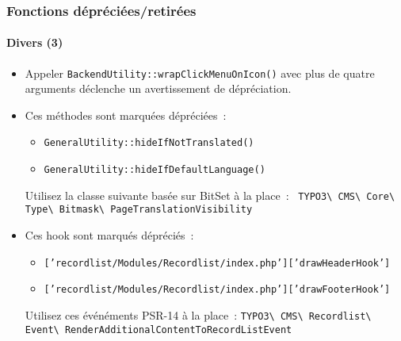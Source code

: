 %

\begin{frame}[fragile]
	\frametitle{Fonctions dépréciées/retirées}
	\framesubtitle{Divers (3)}

	\begin{itemize}
		\item Appeler \texttt{BackendUtility::wrapClickMenuOnIcon()} avec plus
			de quatre arguments déclenche un avertissement de dépréciation.
		\item Ces méthodes sont marquées dépréciées~:
			\begin{itemize}\smaller
				\item \texttt{GeneralUtility::hideIfNotTranslated()}
				\item \texttt{GeneralUtility::hideIfDefaultLanguage()}
			\end{itemize}\normalsize
			\small
				Utilisez la classe suivante basée sur BitSet à la place~:\newline
				\smaller\texttt{
					TYPO3\textbackslash
					CMS\textbackslash
					Core\textbackslash
					Type\textbackslash
					Bitmask\textbackslash
					PageTranslationVisibility}
			\normalsize

		\item Ces hook sont marqués dépréciés~:
			\begin{itemize}\smaller
				\item \texttt{['recordlist/Modules/Recordlist/index.php']['drawHeaderHook']}
				\item \texttt{['recordlist/Modules/Recordlist/index.php']['drawFooterHook']}
			\end{itemize}\normalsize
			\small
				Utilisez ces événéments PSR-14 à la place~:\newline
				\smaller\texttt{TYPO3\textbackslash
					CMS\textbackslash
					Recordlist\textbackslash
					Event\textbackslash
					RenderAdditionalContentToRecordListEvent}
			\normalsize

	\end{itemize}

\end{frame}

